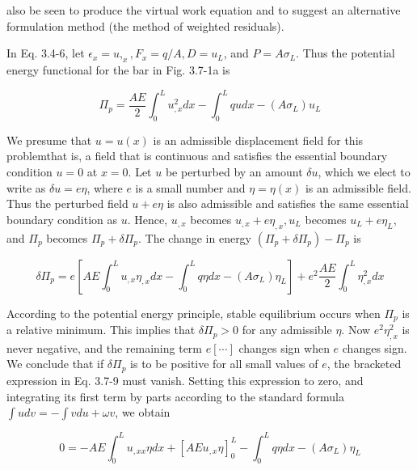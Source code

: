 \documentclass[10pt]{article}
\begin{document}
also be seen to produce the virtual work equation and to suggest an alternative formulation method (the method of weighted residuals).

In Eq. 3.4-6, let $\epsilon_{x}=u,_{x}, F_{x}=q / A, D=u_{L}$, and $P=A \sigma_{L}$. Thus the potential energy functional for the bar in Fig. 3.7-1a is

\begin{equation*}
\Pi_{p}=\frac{A E}{2} \int_{0}^{L} u_{, x}^{2} d x-\int_{0}^{L} q u d x-\left(A \sigma_{L}\right) u_{L} \tag{3.7-8}
\end{equation*}

We presume that $u=u(x)$ is an admissible displacement field for this problemthat is, a field that is continuous and satisfies the essential boundary condition $u=0$ at $x=0$. Let $u$ be perturbed by an amount $\delta u$, which we elect to write as $\delta u=e \eta$, where $e$ is a small number and $\eta=\eta(x)$ is an admissible field. Thus the perturbed field $u+e \eta$ is also admissible and satisfies the same essential boundary condition as $u$. Hence, $u_{, x}$ becomes $u_{, x}+e \eta_{, x}, u_{L}$ becomes $u_{L}+e \eta_{L}$, and $\Pi_{p}$ becomes $\Pi_{p}+\delta \Pi_{p}$. The change in energy $\left(\Pi_{p}+\delta \Pi_{p}\right)-\Pi_{p}$ is

\begin{equation*}
\delta \Pi_{p}=e\left[A E \int_{0}^{L} u_{,x} \eta_{, x} d x-\int_{0}^{L} q \eta d x-\left(A \sigma_{L}\right) \eta_{L}\right]+e^{2} \frac{A E}{2} \int_{0}^{L} \eta_{, x}^{2} d x \tag{3.7-9}
\end{equation*}

According to the potential energy principle, stable equilibrium occurs when $\Pi_{p}$ is a relative minimum. This implies that $\delta \Pi_{p}>0$ for any admissible $\eta$. Now $e^{2} \eta_{, x}^{2}$ is never negative, and the remaining term $e[\cdots]$ changes sign when $e$ changes sign. We conclude that if $\delta \Pi_{p}$ is to be positive for all small values of $e$, the bracketed expression in Eq. 3.7-9 must vanish. Setting this expression to zero, and integrating its first term by parts according to the standard formula $\int u d v=-\int v d u+ \omega v$, we obtain

\begin{equation*}
0=-A E \int_{0}^{L} u_{, x x} \eta d x+\left[A E u_{, x} \eta\right]_{0}^{L}-\int_{0}^{L} q \eta d x-\left(A \sigma_{L}\right) \eta_{L} \tag{3.7-10}
\end{equation*}
\end{document}
